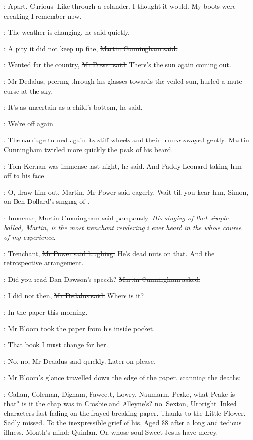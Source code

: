 \BloomInt:
Apart.
Curious.
Like through a colander.
I thought it would.
My boots were creaking I remember now.

\Bloom:
The weather is changing,
\sout{he said quietly.}

\cunningham:
A pity it did not keep up fine,
\sout{Martin Cunningham said.}

\power:
Wanted for the country,
\sout{Mr Power said.}
There's the sun again coming out.

:
Mr Dedalus, peering through his glasses towards the veiled sun,
hurled a mute curse at the sky.

\simon:
It's as uncertain as a child's bottom,
\sout{he said.}

\cunningham:
We're off again.

:
The carriage turned again its stiff wheels
and their trunks swayed gently.
Martin Cunningham twirled more quickly the peak of his beard.

\cunningham:
Tom Kernan was immense last night,
\sout{he said.}
And Paddy Leonard taking him off to his face.

\power:
O, draw him out, Martin,
\sout{Mr Power said eagerly.}
Wait till you hear him, Simon,
on Ben Dollard's singing of .

\cunningham:
Immense,
\sout{Martin Cunningham said pompously.}
\emph{His singing of that simple ballad, Martin,
is the most trenchant rendering i ever heard in the whole course of my experience.}

\power:
Trenchant,
\sout{Mr Power said laughing.}
He's dead nuts on that.
And the retrospective arrangement.%

\cunningham:
Did you read Dan Dawson's speech?
\sout{Martin Cunningham asked.}

\simon:
I did not then,
\sout{Mr Dedalus said.}
Where is it?

\cunningham:
In the paper this morning.

:
Mr Bloom took the paper from his inside pocket.

\BloomInt:
That book I must change for her.

\simon:
No, no,
\sout{Mr Dedalus said quickly.}
Later on please.

:
Mr Bloom's glance travelled down the edge of the paper,
scanning the deaths:

\BloomInt:
Callan, Coleman, Dignam, Fawcett, Lowry, Naumann,
Peake, what Peake is that?
is it the chap was in Crosbie and Alleyne's?
no, Sexton, Urbright.
Inked characters fast fading on the frayed breaking paper.
Thanks to the Little Flower.
Sadly missed.
To the inexpressible grief of his.
Aged 88 after a long and tedious illness.
Month's mind:
Quinlan.
On whose soul Sweet Jesus have mercy.

